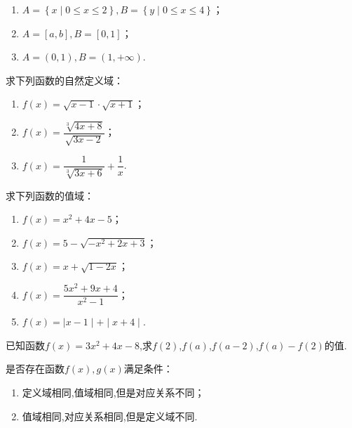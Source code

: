 \documentclass[lang=cn,math=cm,chinesefont=nofont,11pt,scheme=chinese,twocol]{elegantbook}
\begin{document}
\begin{enumerate}
  \item $A=\left\{x\mid 0\leqslant x\leqslant 2\right\},B=\left\{y\mid 0\leqslant x\leqslant 4\right\}$；
  \item $A=[a,b],B=[0,1]$；
  \item $A=(0,1),B=(1,+\infty)$.
\end{enumerate}

\begin{exercise}
  求下列函数的自然定义域：
\end{exercise}

\begin{spacing}{1.8}
  \begin{enumerate}
  \item $f(x)=\sqrt{x-1}\cdot\sqrt{x+1}$；
  \item $f(x)=\dfrac{\sqrt[3]{4x+8}}{\sqrt{3x-2}}$；
  \item $f(x)=\dfrac1{\sqrt[3]{3x+6}}+\dfrac1x$.
  \end{enumerate}
\end{spacing}

\begin{exercise}
  求下列函数的值域：
\end{exercise}

\begin{spacing}{1.8}
\begin{enumerate}
  \item $f(x)=x^2+4x-5$；
  \item $f(x)=5-\sqrt{-x^{2}+2x+3}$；
  \item $f(x)=x+\sqrt{1-2x}$；
  \item $f(x)=\dfrac{5x^{2}+9x+4}{x^{2}-1}$；
  \item $f(x)=\mid x-1\mid+\mid x+4\mid $.
\end{enumerate}
\end{spacing}

\begin{exercise}
  已知函数$f(x)=3x^2+4x-8$,求$f(2)$,$f(a)$,$f(a-2)$,$f(a)-f(2)$的值.
\end{exercise}

\begin{exercise}\label{2017RJA.P74.17}
  是否存在函数$f(x),g(x)$满足条件：
\end{exercise}

\begin{enumerate}
  \item 定义域相同,值域相同,但是对应关系不同；
  \item 值域相同,对应关系相同,但是定义域不同.
\end{enumerate}
\end{document}
